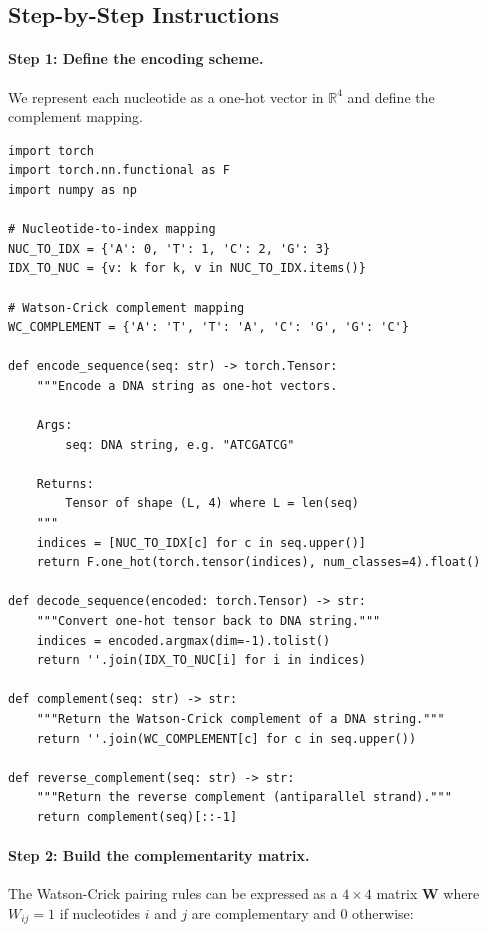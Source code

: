 \subsection{Step-by-Step Instructions}

\paragraph{Step 1: Define the encoding scheme.}
We represent each nucleotide as a one-hot vector in $\mathbb{R}^4$ and define the complement mapping.

\begin{lstlisting}[style=dogmapython, caption={Lab 1: DNA encoding and complement mapping.}]
import torch
import torch.nn.functional as F
import numpy as np

# Nucleotide-to-index mapping
NUC_TO_IDX = {'A': 0, 'T': 1, 'C': 2, 'G': 3}
IDX_TO_NUC = {v: k for k, v in NUC_TO_IDX.items()}

# Watson-Crick complement mapping
WC_COMPLEMENT = {'A': 'T', 'T': 'A', 'C': 'G', 'G': 'C'}

def encode_sequence(seq: str) -> torch.Tensor:
    """Encode a DNA string as one-hot vectors.

    Args:
        seq: DNA string, e.g. "ATCGATCG"

    Returns:
        Tensor of shape (L, 4) where L = len(seq)
    """
    indices = [NUC_TO_IDX[c] for c in seq.upper()]
    return F.one_hot(torch.tensor(indices), num_classes=4).float()

def decode_sequence(encoded: torch.Tensor) -> str:
    """Convert one-hot tensor back to DNA string."""
    indices = encoded.argmax(dim=-1).tolist()
    return ''.join(IDX_TO_NUC[i] for i in indices)

def complement(seq: str) -> str:
    """Return the Watson-Crick complement of a DNA string."""
    return ''.join(WC_COMPLEMENT[c] for c in seq.upper())

def reverse_complement(seq: str) -> str:
    """Return the reverse complement (antiparallel strand)."""
    return complement(seq)[::-1]
\end{lstlisting}

\paragraph{Step 2: Build the complementarity matrix.}
The Watson-Crick pairing rules can be expressed as a $4 \times 4$ matrix $\mathbf{W}$ where $W_{ij} = 1$ if nucleotides $i$ and $j$ are complementary and $0$ otherwise:

